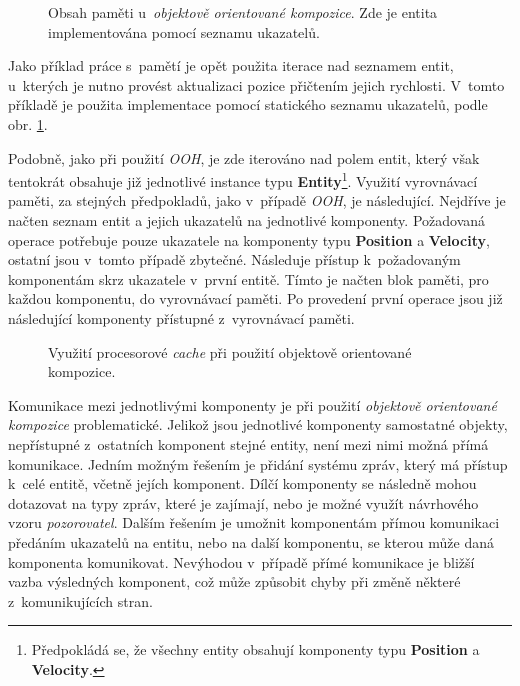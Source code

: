 \begin{figure}[H]
	\centering
	\caption{Obsah paměti u~\emph{objektově orientované kompozice}. Zde je entita implementována pomocí seznamu ukazatelů.}
	\label{Fig:OOCImpl}
\end{figure}

Jako příklad práce s~pamětí je opět použita iterace nad seznamem entit, u~kterých je nutno provést aktualizaci pozice přičtením jejich rychlosti. V~tomto příkladě je použita implementace pomocí statického seznamu ukazatelů, podle obr. \ref{Fig:OOCImpl}.

Podobně, jako při použití \emph{OOH}, je zde iterováno nad polem entit, který však tentokrát obsahuje již jednotlivé instance typu \textbf{Entity}\footnote{Předpokládá se, že všechny entity obsahují komponenty typu \textbf{Position} a \textbf{Velocity}.}. Využití vyrovnávací paměti, za stejných předpokladů, jako v~případě \emph{OOH}, je následující. Nejdříve je načten seznam entit a jejich ukazatelů na jednotlivé komponenty. Požadovaná operace potřebuje pouze ukazatele na komponenty typu \textbf{Position} a \textbf{Velocity}, ostatní jsou v~tomto případě zbytečné. Následuje přístup k~požadovaným komponentám skrz ukazatele v~první entitě. Tímto je načten blok paměti, pro každou komponentu, do vyrovnávací paměti. Po provedení první operace jsou již následující komponenty přístupné z~vyrovnávací paměti. 

\begin{figure}[H]
	\centering
	\caption{Využití procesorové \emph{cache} při použití objektově orientované kompozice.}
	\label{Fig:OOCCache}
\end{figure}

Komunikace mezi jednotlivými komponenty je při použití \emph{objektově orientované kompozice} problematické. Jelikož jsou jednotlivé komponenty samostatné objekty, nepřístupné z~ostatních komponent stejné entity, není mezi nimi možná přímá komunikace. Jedním možným řešením je přidání systému zpráv, který má přístup k~celé entitě, včetně jejích komponent. Dílčí komponenty se následně mohou dotazovat na typy zpráv, které je zajímají, nebo je možné využít návrhového vzoru \emph{pozorovatel}. Dalším řešením je umožnit komponentám přímou komunikaci předáním ukazatelů na entitu, nebo na další komponentu, se kterou může daná komponenta komunikovat. Nevýhodou v~případě přímé komunikace je bližší vazba výsledných komponent, což může způsobit chyby při změně některé z~komunikujících stran.


